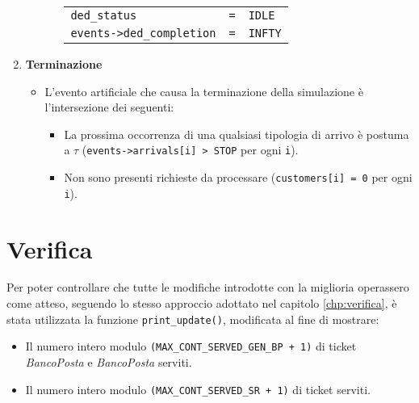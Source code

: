 \begin{enumerate}[label=Step \arabic*), align=left, leftmargin=*]
\begin{itemize}
\begin{itemize}
\begin{center}
\begin{tabular}{l l l}
\texttt{ded\_status} & \texttt{=} & \texttt{IDLE} \\
\texttt{events->ded\_completion} & \texttt{=} & \texttt{INFTY}
\end{tabular}
\end{center}
\end{itemize}
\end{itemize}
\item \textbf{Terminazione}
\begin{itemize}
\item L'evento artificiale che causa la terminazione della simulazione è l'intersezione dei seguenti:
\begin{itemize}
\item La prossima occorrenza di una qualsiasi tipologia di arrivo è postuma a $\tau$ (\texttt{events->arrivals[i] > STOP} per ogni \texttt{i}).
\item Non sono presenti richieste da processare (\texttt{customers[i] = 0} per ogni \texttt{i}).
\end{itemize}
\end{itemize}
\end{enumerate}

\section{Verifica}\label{sec:miglioria-verifica}
Per poter controllare che tutte le modifiche introdotte con la miglioria operassero come atteso, seguendo lo stesso approccio adottato nel capitolo \ref{chp:verifica}, è stata utilizzata la funzione \texttt{print\_update()}, modificata al fine di mostrare:
\begin{itemize}
\item Il numero intero modulo \texttt{(MAX\_CONT\_SERVED\_GEN\_BP + 1)} di ticket \uo{}	\textsl{BancoPosta} e \pp{} \textsl{BancoPosta} serviti.
\item Il numero intero modulo \texttt{(MAX\_CONT\_SERVED\_SR + 1)} di ticket \sr{} serviti.
\end{itemize}

